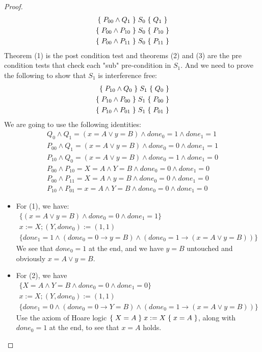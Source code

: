 \begin{proof}
\begin{gather}
{\{\;P_{00}\land Q_1\;\}\;S_0\;\{\;Q_1\;\}}\\
{\{\;P_{00}\land P_{10}\;\}\;S_0\;\{\;P_{10}\;\}}\\
{\{\;P_{00}\land P_{11}\;\}\;S_0\;\{\;P_{11}\;\}}
\end{gather}
Theorem (1) is the post condition test and theorems (2) and (3) are the pre condition tests that check each "sub" pre-condition in $S_1$. And we need to prove the following to show that $S_1$ is interference free:
\begin{align}
{\{\;P_{10}\land Q_0\;\}\;S_1\;\{\;Q_0\;\}}\\
{\{\;P_{10}\land P_{00}\;\}\;S_1\;\{\;P_{00}\;\}}\\
{\{\;P_{10}\land P_{01}\;\}\;S_1\;\{\;P_{01}\;\}}
\end{align}
We are going to use the following identities:
\begin{gather*}
Q_0\land Q_1=(x=A\lor y=B)\land done_0=1\land done_1=1 \\
P_{00}\land Q_1=(x=A\lor y=B)\land done_0=0\land done_1=1 \\
P_{10}\land Q_0=(x=A\lor y=B)\land done_0=1\land done_1=0 \\
P_{00}\land P_{10}=X=A\land Y=B\land done_0=0\land done_1=0 \\
P_{00}\land P_{11}=X=A\land y=B\land done_0=0\land done_1=0 \\
P_{10}\land P_{01}=x=A\land Y=B\land done_0=0\land done_1=0
\end{gather*}
\begin{itemize}
\item For (1), we have:
\begin{gather*}
\{(x=A\lor y=B)\land done_0=0\land done_1=1\}\\
x:=X;(Y,done_0):=(1,1)\\
\{done_1=1\land (done_0=0\rightarrow y=B)\land (done_0=1\rightarrow (x=A\lor y=B))\}
\end{gather*}
We see that $done_0=1$ at the end, and we have $y=B$ untouched and obviously  $x=A\lor y=B$.
\item For (2), we have
\begin{gather*}
\{X=A\land Y=B\land done_0=0\land done_1=0\}\\
x:=X;(Y,done_0):=(1,1)\\
\{done_1=0\land (done_0=0\rightarrow Y=B)\land (done_0=1\rightarrow (x=A\lor y=B))\}
\end{gather*}
Use the axiom of Hoare logic ${\{\;X=A\;\}\;x:=X\;\{\;x=A\;\}}$, along with $done_0=1$ at the end, to see that $x=A$ holds.

\end{itemize}
\end{proof}
